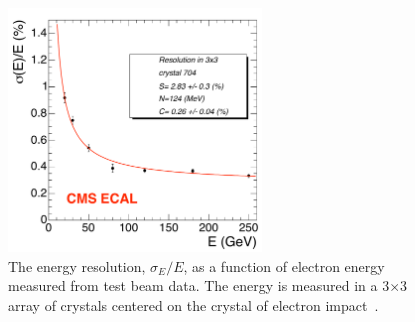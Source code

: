 \begin{figure}
  \includegraphics[width=0.6\textwidth]{cms_experiment/plots/ecal_sigma_e_test_beam.pdf}
  \caption[\acs{ECAL} energy resolution]{The \ECAL energy resolution, $\sigma_{E}/E$, as a function of electron energy measured from test beam data. The energy is measured in a 3$\times$3 array of crystals centered on the crystal of electron impact~\cite{CMS_JINST}.}
  \label{fig:sigma_e_test_beam}
\end{figure}
